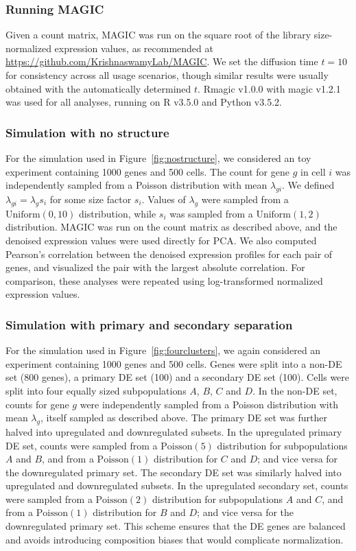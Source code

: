 \documentclass[10pt,letterpaper]{article}
\begin{document}
\subsubsection*{Running MAGIC}
Given a count matrix, MAGIC was run on the square root of the library size-normalized expression values, as recommended at \url{https://github.com/KrishnaswamyLab/MAGIC}.
We set the diffusion time $t=10$ for consistency across all usage scenarios, though similar results were usually obtained with the automatically determined $t$.
Rmagic v1.0.0 with magic v1.2.1 was used for all analyses, running on R v3.5.0 and Python v3.5.2.

\subsubsection*{Simulation with no structure}
For the simulation used in Figure~\ref{fig:nostructure}, we considered an toy experiment containing 1000 genes and 500 cells.
The count for gene $g$ in cell $i$ was independently sampled from a Poisson distribution with mean $\lambda_{gi}$.
We defined $\lambda_{gi}= \lambda_g s_i$ for some size factor $s_i$.
Values of $\lambda_g$ were sampled from a $\mbox{Uniform}(0, 10)$ distribution, while $s_i$ was sampled from a $\mbox{Uniform}(1, 2)$ distribution.       
MAGIC was run on the count matrix as described above, and the denoised expression values were used directly for PCA.
We also computed Pearson's correlation between the denoised expression profiles for each pair of genes, and visualized the pair with the largest absolute correlation.
For comparison, these analyses were repeated using log-transformed normalized expression values.

\subsubsection*{Simulation with primary and secondary separation}
For the simulation used in Figure~\ref{fig:fourclusters}, we again considered an experiment containing 1000 genes and 500 cells.
Genes were split into a non-DE set (800 genes), a primary DE set (100) and a secondary DE set (100).
Cells were split into four equally sized subpopulations $A$, $B$, $C$ and $D$.
In the non-DE set, counts for gene $g$ were independently sampled from a Poisson distribution with mean $\lambda_{g}$, itself sampled as described above.
The primary DE set was further halved into upregulated and downregulated subsets.
In the upregulated primary DE set, counts were sampled from a $\mbox{Poisson}(5)$ distribution for subpopulations $A$ and $B$, 
and from a $\mbox{Poisson}(1)$ distribution for $C$ and $D$; and vice versa for the downregulated primary set.
The secondary DE set was similarly halved into upregulated and downregulated subsets.
In the upregulated secondary set, counts were sampled from a $\mbox{Poisson}(2)$ distribution for subpopulations $A$ and $C$, 
and from a $\mbox{Poisson}(1)$ distribution for $B$ and $D$; and vice versa for the downregulated primary set.
This scheme ensures that the DE genes are balanced and avoids introducing composition biases \cite{robinson2010scaling} that would complicate normalization.
\end{document}
